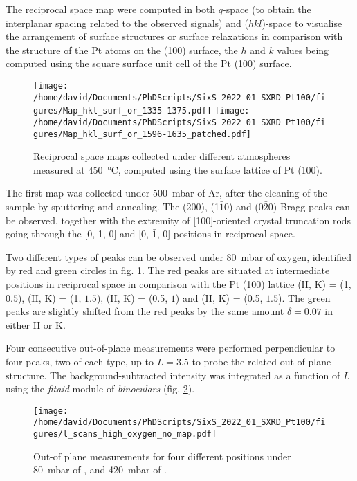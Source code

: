 The reciprocal space map were computed in both $q$-space (to obtain the interplanar spacing related to the observed signals) and ($hkl$)-space to visualise the arrangement of surface structures or surface relaxations in comparison with the structure of the Pt atoms on the (100) surface, the $h$ and $k$ values being computed using the square surface unit cell of the Pt (100) surface.

\begin{figure}[!htb]
    \centering
    \texttt{[image: /home/david/Documents/PhDScripts/SixS\_2022\_01\_SXRD\_Pt100/figures/Map\_hkl\_surf\_or\_1335-1375.pdf]}
    \texttt{[image: /home/david/Documents/PhDScripts/SixS\_2022\_01\_SXRD\_Pt100/figures/Map\_hkl\_surf\_or\_1596-1635\_patched.pdf]}
    \caption{
        Reciprocal space maps collected under different atmospheres measured at \qty{450}{\degreeCelsius}, computed using the surface lattice of Pt (100).
    }
    \label{fig:MapsPt100A}
\end{figure}

The first map was collected under \qty{500}{\milli\bar} of Ar, after the cleaning of the sample by sputtering and annealing.
The (200), (1$\bar{1}$0) and (0$\bar{2}$0) Bragg peaks can be observed, together with the extremity of [100]-oriented crystal truncation rods going through the [0, 1, 0] and [0, $\bar{1}$, 0] positions in reciprocal space.

Two different types of peaks can be observed under \qty{80}{\milli\bar} of oxygen, identified by red and green circles in fig. \ref{fig:MapsPt100A}.
The red peaks are situated at intermediate positions in reciprocal space in comparison with the Pt (100) lattice (H, K) = (1, $\bar{0.5}$), (H, K) = (1, $\bar{1.5}$), (H, K) = (0.5, $\bar{1}$) and (H, K) = (0.5, $\bar{1.5}$).
The green peaks are slightly shifted from the red peaks by the same amount $\delta = 0.07$ in either H or K.

Four consecutive out-of-plane measurements were performed perpendicular to four peaks, two of each type, up to $L=3.5$ to probe the related out-of-plane structure.
The background-subtracted intensity was integrated as a function of $L$ using the \textit{fitaid} module of \textit{binoculars} (fig. \ref{fig:LScansHighOxygenPt100}).

\begin{figure}[!htb]
    \centering
    \texttt{[image: /home/david/Documents/PhDScripts/SixS\_2022\_01\_SXRD\_Pt100/figures/l\_scans\_high\_oxygen\_no\_map.pdf]}
    \caption{
        Out-of plane measurements for four different positions under \qty{80}{\milli\bar} of , and \qty{420}{\milli\bar} of .
    }
    \label{fig:LScansHighOxygenPt100}
\end{figure}

